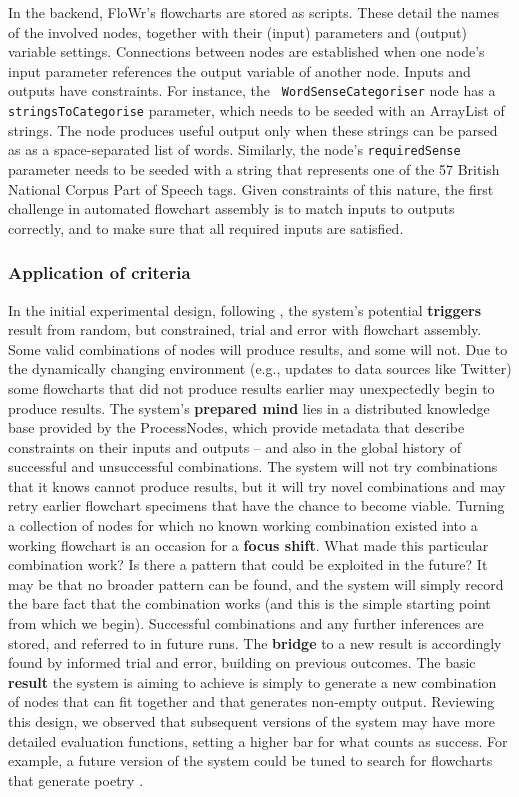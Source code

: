 In the backend, {\sf FloWr}'s flowcharts are stored as scripts.  These
detail the names of the involved nodes, together with their (input)
parameters and (output) variable settings.  Connections between nodes
are established when one node's input parameter references the output
variable of another node.
%
Inputs and outputs have constraints.  For instance, the {\tt
  WordSenseCategoriser} node has a {\tt stringsToCategorise}
parameter, which needs to be seeded with an ArrayList of strings.  The node produces useful output only when these strings can be parsed as as a space-separated list of words.  Similarly, the node's {\tt requiredSense} parameter needs to be seeded with a string that represents one of the 57 British National Corpus Part of Speech tags.  Given constraints of this nature, the first challenge in automated flowchart assembly is to match inputs to outputs correctly, and to make sure that all required inputs are satisfied.

\subsubsection{Application of criteria}

In the initial experimental design, following ,
the system's potential \textbf{triggers} result from random, but constrained,
trial and error with flowchart assembly.  Some valid combinations of nodes will
produce results, and some will not.  Due to the dynamically changing
environment (e.g., updates to data sources like Twitter) some
flowcharts that did not produce results earlier may unexpectedly begin
to produce results.
%
The system's \textbf{prepared mind} lies in a distributed knowledge
base provided by the ProcessNodes, which provide metadata that
describe constraints on their inputs and outputs -- and also in the
global history of successful and unsuccessful combinations.
%
The system will not try combinations that it knows cannot produce
results, but it will try novel combinations and may retry earlier
flowchart specimens that have the chance to become viable.  Turning a
collection of nodes for which no known working combination existed
into a working flowchart is an occasion for a \textbf{focus shift}.
What made this particular combination work?  Is there a pattern that
could be exploited in the future?  It may be that no broader pattern
can be found, and the system will simply record the bare fact that the
combination works (and this is the simple starting point from which we
begin).
%
Successful combinations and any further inferences are stored, and
referred to in future runs.  The \textbf{bridge} to a new result is
accordingly found by informed trial and error, building on previous
outcomes.
%
The basic \textbf{result} the system is aiming to achieve is simply to
generate a new combination of nodes that can fit together and that
generates non-empty output.  Reviewing this design, we observed that
subsequent versions of the system may have more detailed evaluation
functions, setting a higher bar for what counts as success.  For
example, a future version of the system could be tuned to search for
flowcharts that generate poetry \cite{corneli2015computational}.

